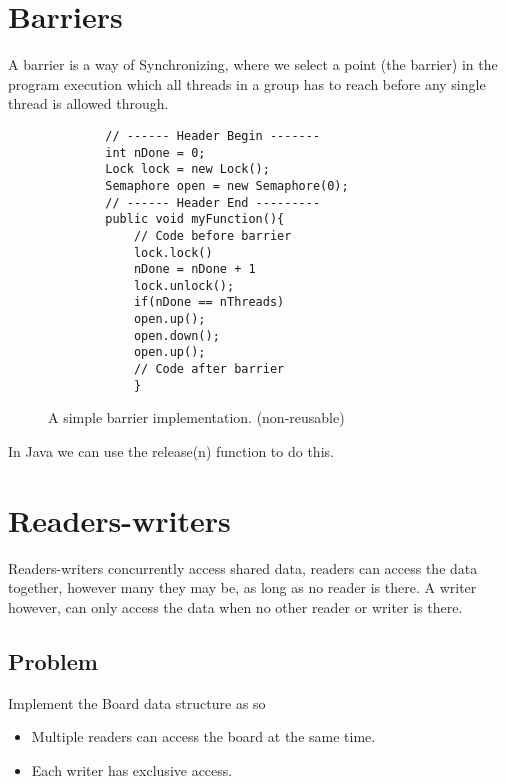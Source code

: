 \section{Barriers}
A barrier is a way of Synchronizing, where we select a point (the barrier) in the program execution which all threads in a group has to reach before any single thread is allowed through.
\begin{figure}[H]
	\label{fig:barrier}
	\begin{lstlisting}
		// ------ Header Begin -------
		int nDone = 0;
		Lock lock = new Lock();
		Semaphore open = new Semaphore(0);
		// ------ Header End ---------
		public void myFunction(){
			// Code before barrier
			lock.lock()
			nDone = nDone + 1
			lock.unlock();
			if(nDone == nThreads)
			open.up();
			open.down();
			open.up();
			// Code after barrier
			}
		\end{lstlisting}
	\caption{A simple barrier implementation. (non-reusable)}
\end{figure}
In Java we can use the release(n) function to do this.

\section{Readers-writers}
Readers-writers concurrently access shared data, readers can access the data together, however many they may be, as long as no reader is there. A writer however, can only access the data when no other reader or writer is there.
\subsection{Problem}
Implement the Board data structure as so \begin{itemize}
	\item Multiple readers can access the board at the same time.
	\item Each writer has exclusive access.
\end{itemize}

